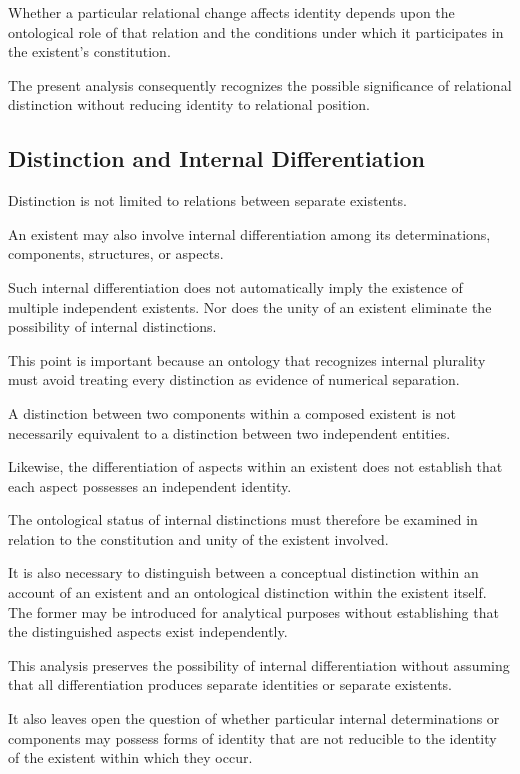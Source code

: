Whether a particular relational change affects
identity depends upon the ontological role
of that relation and the conditions under
which it participates in the existent's
constitution.

The present analysis consequently recognizes
the possible significance of relational
distinction without reducing identity to
relational position.

\subsection{Distinction and Internal Differentiation}

Distinction is not limited to relations
between separate existents.

An existent may also involve internal
differentiation among its determinations,
components, structures, or aspects.

Such internal differentiation does not
automatically imply the existence of
multiple independent existents. Nor does
the unity of an existent eliminate the
possibility of internal distinctions.

This point is important because an ontology
that recognizes internal plurality must
avoid treating every distinction as evidence
of numerical separation.

A distinction between two components within
a composed existent is not necessarily
equivalent to a distinction between two
independent entities.

Likewise, the differentiation of aspects
within an existent does not establish that
each aspect possesses an independent identity.

The ontological status of internal distinctions
must therefore be examined in relation to
the constitution and unity of the existent
involved.

It is also necessary to distinguish between
a conceptual distinction within an account
of an existent and an ontological distinction
within the existent itself. The former may
be introduced for analytical purposes without
establishing that the distinguished aspects
exist independently.

This analysis preserves the possibility of
internal differentiation without assuming
that all differentiation produces separate
identities or separate existents.

It also leaves open the question of whether
particular internal determinations or
components may possess forms of identity
that are not reducible to the identity of
the existent within which they occur.

